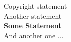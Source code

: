 Copyright statement 
    \\[24pt]
    Another statement 
    \\[24pt]
    \textcolor{\colouredtextcolor}{\textbf{Some Statement}}\\
    And another one ...